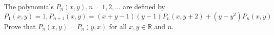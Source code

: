 The polynomials $P_n(x,y), n=1,2,... $ are defined by \[P_1(x,y)=1, P_{n+1}(x,y)=(x+y-1)(y+1)P_n(x,y+2)+(y-y^2)P_n(x,y)\] Prove that $P_{n}(x,y)=P_{n}(y,x)$ for all $x,y \in \mathbb{R}$ and $n $.